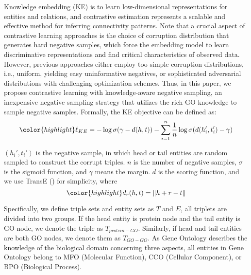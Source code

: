 Knowledge embedding (KE) is to learn low-dimensional representations for entities and relations, and contrastive estimation represents a scalable and effective method for inferring connectivity patterns. 
Note that a crucial aspect of contrastive learning approaches is the choice of corruption distribution that generates hard negative samples, which force the embedding model to learn discriminative representations and find critical characteristics of observed data.
However, previous approaches either employ too simple corruption distributions, i.e., uniform, yielding easy uninformative negatives, or sophisticated adversarial distributions with challenging optimization schemes.
Thus, in this paper, we propose contrastive learning with knowledge-aware negative sampling, an inexpensive negative sampling strategy that utilizes the rich GO knowledge to sample negative samples.
Formally, the KE objective can be defined as: 
\begin{equation}
\label{eq:1}
{\color{highlight} 
\ell_{KE}=-\log{\sigma (\gamma-d(h,t))} - \sum_{i=1}^{n}{\frac{1}{n}\log{\sigma(d(h_i', t_i')-\gamma)} } 
}
\end{equation}

$(h_i', t_i')$ is the negative sample, in which head or tail entities are random sampled to construct the corrupt triples.
$n$ is the number of negative samples, $\sigma$ is the sigmoid function, and $\gamma$ means the margin.
$d$ is the scoring function, and we use TransE (\cite{DBLP:conf/nips/BordesUGWY13}) for simplicity, where 
\begin{equation}
{\color{highlight} 
d_r(h, t) = \left \| h + r - t \right \| 
}
\end{equation}

Specifically, we define triple sets and entity sets as $T$ and $E$, all triplets are divided into two groups.
If the head entity is protein node and the tail entity is GO node, we denote the triple as $T_{protein-GO}$.
Similarly, if head and tail entities are both GO nodes, we denote them as $T_{GO-GO}$.
As Gene Ontology describes the knowledge of the biological domain concerning three aspects, all entities in Gene Ontology belong to MFO (Molecular Function),  CCO (Cellular Component), or BPO (Biological Process).

